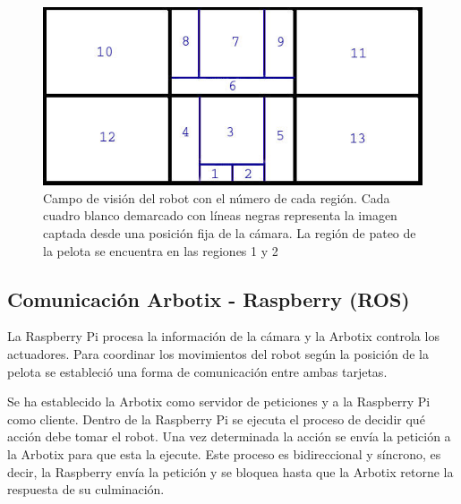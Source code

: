 



\begin{figure}[hbtp]

\centering
\includegraphics[scale=0.5]{imagenes/Regiones.jpg}
\caption{Campo de visión del robot con el número de cada región. Cada cuadro blanco demarcado con líneas negras representa la imagen captada desde una posición fija de la cámara. La región de pateo de la pelota se encuentra en las regiones 1 y 2 }
\label{divisionCam}
\end{figure}

\subsection{Comunicación Arbotix - Raspberry (ROS)}\label{comunicacion}

La Raspberry Pi procesa la información de la cámara y la Arbotix controla los actuadores. Para coordinar los movimientos del robot según la posición de la pelota se estableció una forma de comunicación entre ambas tarjetas. 

Se ha establecido la Arbotix como servidor de peticiones y a la Raspberry Pi como cliente. Dentro de la Raspberry Pi se ejecuta el proceso de decidir qué acción debe tomar el robot. Una vez determinada la acción se envía la petición a la Arbotix para que esta la ejecute. Este proceso es bidireccional y síncrono, es decir, la Raspberry envía la petición y se bloquea hasta que la Arbotix retorne la respuesta de su culminación.  

